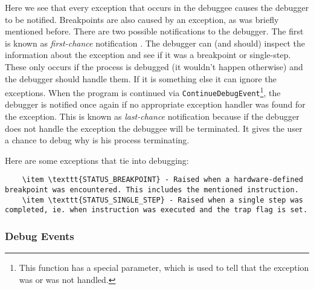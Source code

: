 Here we see that every exception that occurs in the debuggee causes the debugger to be notified. Breakpoints are also caused by an exception, as was briefly mentioned before. There are two possible notifications to the debugger. The first is known as \textit{first-chance} notification \cite{windows-msdn-dbg-exc-handling}. The debugger can (and should) inspect the information about the exception and see if it was a breakpoint or single-step. These only occurs if the process is debugged (it wouldn't happen otherwise) and the debugger should handle them. If it is something else it can ignore the exceptions. When the program is continued via \lstinline{ContinueDebugEvent}\footnote{This function has a special parameter, which is used to tell that the exception was or was not handled.}, the debugger is notified once again if no appropriate exception handler was found for the exception. This is known as \textit{last-chance} notification because if the debugger does not handle the exception the debuggee will be terminated. It gives the user a chance to debug why is his process terminating.

Here are some exceptions that tie into debugging:
\begin{lstlisting}
    \item \texttt{STATUS_BREAKPOINT} - Raised when a hardware-defined breakpoint was encountered. This includes the mentioned instruction.
    \item \texttt{STATUS_SINGLE_STEP} - Raised when a single step was completed, ie. when instruction was executed and the trap flag is set.
\end{lstlisting}

\subsubsection*{Debug Events}
